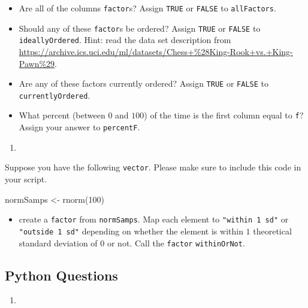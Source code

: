 \documentclass[
  12pt,
  krantz2]{krantz}
\makeatletter
\newenvironment{Shaded}{\begin{snugshade}}{\end{snugshade}}
\newcommand{\DecValTok}[1]{\textcolor[rgb]{0.06,0.06,0.06}{#1}}
\newcommand{\FunctionTok}[1]{\textcolor[rgb]{0,0,0}{#1}}
\newcommand{\NormalTok}[1]{#1}
\newcommand{\OtherTok}[1]{\textcolor[rgb]{0.37,0.37,0.37}{#1}}
\providecommand{\tightlist}{%
  \setlength{\itemsep}{0pt}\setlength{\parskip}{0pt}}
\newenvironment{kframe}{%
\medskip{}
\setlength{\fboxsep}{.8em}
 \def\at@end@of@kframe{}%
 \ifinner\ifhmode%
  \def\at@end@of@kframe{\end{minipage}}%
  \begin{minipage}{\columnwidth}%
 \fi\fi%
 \def\FrameCommand##1{\hskip\@totalleftmargin \hskip-\fboxsep
 \colorbox{shadecolor}{##1}\hskip-\fboxsep
     \hskip-\linewidth \hskip-\@totalleftmargin \hskip\columnwidth}%
 \MakeFramed {\advance\hsize-\width
   \@totalleftmargin\z@ \linewidth\hsize
   \@setminipage}}%
 {\par\unskip\endMakeFramed%
 \at@end@of@kframe}
\renewenvironment{Shaded}{\begin{kframe}}{\end{kframe}}
\makeatother
\begin{document}
\begin{itemize}
\tightlist
\item
  Are all of the columns \texttt{factor}s? Assign \texttt{TRUE} or \texttt{FALSE} to \texttt{allFactors}.
\item
  Should any of these \texttt{factor}s be ordered? Assign \texttt{TRUE} or \texttt{FALSE} to \texttt{ideallyOrdered}. Hint: read the data set description from \url{https://archive.ics.uci.edu/ml/datasets/Chess+\%28King-Rook+vs.+King-Pawn\%29}.
\item
  Are any of these factors currently ordered? Assign \texttt{TRUE} or \texttt{FALSE} to \texttt{currentlyOrdered}.
\item
  What percent (between \(0\) and \(100\)) of the time is the first column equal to \texttt{\textquotesingle{}f\textquotesingle{}}? Assign your answer to \texttt{percentF}.
\end{itemize}

\begin{enumerate}
\def\labelenumi{\arabic{enumi}.}
\setcounter{enumi}{1}
\tightlist
\item
\end{enumerate}

Suppose you have the following \texttt{vector}. Please make sure to include this code in your script.

\begin{Shaded}
\begin{Highlighting}[]
\NormalTok{normSamps }\OtherTok{\textless{}{-}} \FunctionTok{rnorm}\NormalTok{(}\DecValTok{100}\NormalTok{)}
\end{Highlighting}
\end{Shaded}

\begin{itemize}
\tightlist
\item
  create a \texttt{factor} from \texttt{normSamps}. Map each element to \texttt{"within\ 1\ sd"} or \texttt{"outside\ 1\ sd"} depending on whether the element is within \(1\) theoretical standard deviation of \(0\) or not. Call the \texttt{factor} \texttt{withinOrNot}.
\end{itemize}

\hypertarget{python-questions-5}{%
\subsection{Python Questions}\label{python-questions-5}}

\begin{enumerate}
\def\labelenumi{\arabic{enumi}.}
\tightlist
\item
\end{enumerate}
\end{document}
